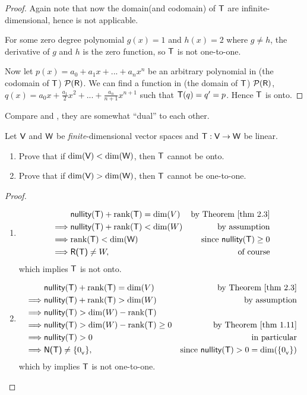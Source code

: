 \begin{proof}
Again note that now the domain(and codomain) of \(\textsf{T}\) are infinite-dimensional, hence  is not applicable.

For some zero degree polynomial \(g(x) = 1\) and \(h(x) = 2\) where \(g \ne h\), the derivative of \(g\) and \(h\) is the zero function, so \(\textsf{T}\) is not one-to-one.

Now let \(p(x) = a_0 + a_1 x + ... + a_n x^n\) be an arbitrary polynomial in (the codomain of \(\textsf{T}\)) \(\mathcal{P}(\textsf{R})\).
We can find a function in (the domain of \(\textsf{T}\)) \(\mathcal{P}(\textsf{R})\), \(q(x) = a_0 x + \frac{a_1}{2} x^2 + ... + \frac{a_n}{n + 1} x^{n + 1}\) such that \(\textsf{T}(q) = q' = p\).
Hence \(\textsf{T}\) is onto.
\end{proof}

\begin{note}
Compare  and , they are somewhat ``dual'' to each other.
\end{note}

\begin{exercise} \label{exercise 2.1.17}
Let \(\textsf{V}\) and \(\textsf{W}\) be \emph{finite}-dimensional vector spaces and \(\textsf{T}: \textsf{V} \to \textsf{W}\) be linear.
\begin{enumerate}
\item Prove that if \(\dim(\textsf{V}) < \dim(\textsf{W})\), then \(\textsf{T}\) cannot be onto.
\item Prove that if \(\dim(\textsf{V}) > \dim(\textsf{W})\), then \(\textsf{T}\) cannot be one-to-one.
\end{enumerate}
\end{exercise}

\begin{proof} \ 
\begin{enumerate}
\item
\begin{align*}
             & \nullityT + \rankT = \dim(V) & \text{by \THM{2.3}} \\
    \implies & \nullityT + \rankT < \dim(W) & \text{by assumption} \\
    \implies & \rankT < \dim(\W) & \text{since \(\nullityT \ge 0\)} \\
    \implies & \RANGET \ne W, & \text{of course}
\end{align*}
which implies \(\textsf{T}\) is not onto.

\item
\begin{align*}
             & \nullityT + \rankT = \dim(V) & \text{by \THM{2.3}} \\
    \implies & \nullityT + \rankT > \dim(W) & \text{by assumption} \\
    \implies & \nullityT > \dim(W) - \rankT \\
    \implies & \nullityT > \dim(W) - \rankT \ge 0 & \text{by \THM{1.11}} \\
    \implies & \nullityT > 0 & \text{in particular} \\
    \implies & \NULLT \ne \{ \OV \}, & \text{since \(\nullityT > 0 = \dim(\{ \OV \})\)}
\end{align*}
which by  implies \(\textsf{T}\) is not one-to-one.
\end{enumerate}
\end{proof}


